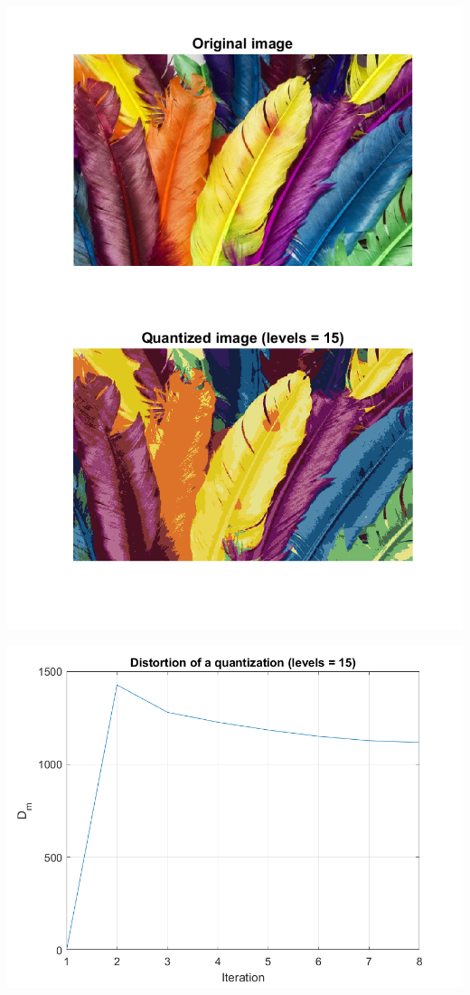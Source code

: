 \documentclass[a4paper]{iacas}
\begin{document}
\vskip 0.1in
\begin{minipage}{1\textwidth}
\centering
	\includegraphics[scale=0.9]{../imgs/imgs_q4/q4_quantized_levels_15_init_1.png}
\end{minipage}
\vskip 0.1in

\vskip 0.1in
\begin{minipage}{1\textwidth}
\centering
	\includegraphics[scale=0.9]{../imgs/imgs_q4/q4_distortion_levels_15_init_1.png}
\end{minipage}
\vskip 0.1in
\end{document}
